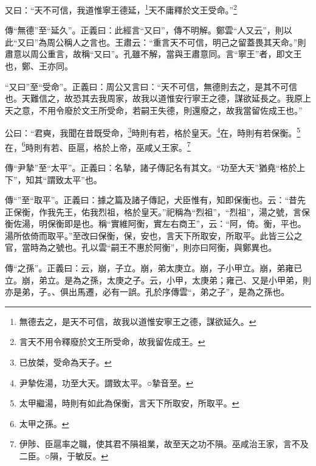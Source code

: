 又曰：“天不可信，我道惟寧王德延，\footnote{無德去之，是天不可信，故我以道惟安寧王之德，謀欲延久。}天不庸釋於文王受命。”\footnote{言天不用令釋廢於文王所受命，故我留佐成王。}


{\noindent\zhuan{}\fzbyks 傳“無德”至“延久”。正義曰：此經言“又曰”，傳不明解。鄭雲“人又云”，則以此“又曰”為周公稱人之言也。王肅云：“重言天不可信，明己之留蓋畏其天命。”則肅意以周公重言，故稱“又曰”。孔雖不解，當與王肅意同。言“寧王”者，即文王也，鄭、王亦同。 \par}

{\noindent\shu{}\fzkt “又曰”至“受命”。正義曰：周公又言曰：“天不可信，無德則去之，是其不可信也。天難信之，故恐其去我周家，故我以道惟安行寧王之德，謀欲延長之。我原上天之意，不用令廢於文王所受命，若嗣王失德，則還廢之，故我當留佐成王也。” \par}

公曰：“君奭，我聞在昔既受命，\footnote{已放桀，受命為天子。}時則有若，格於皇天。\footnote{尹摯佐湯，功至大天。謂致太平。○摯音至。}在，時則有若保衡。\footnote{太甲繼湯，時則有如此為保衡，言天下所取安，所取平。}在，\footnote{太甲之孫。}時則有若、臣扈，格於上帝，巫咸乂王家。\footnote{伊陟、臣扈率之職，使其君不隕祖業，故至天之功不隕。巫咸治王家，言不及二臣。○隕，于敏反。}


{\noindent\zhuan{}\fzbyks 傳“尹摯”至“太平”。正義曰：名摯，諸子傳記名有其文。“功至大天”猶堯“格於上下”，知其“謂致太平”也。 \par}

{\noindent\zhuan{}\fzbyks 傳“”至“取平”。正義曰：據之篇及諸子傳記，犬臣惟有，知即保衡也。云：“昔先正保衡，作我先王，佑我烈祖，格於皇天。”祀稱為“烈祖”，“烈祖”，湯之號，言保衡佐湯，明保衡即是也。稱“實維阿衡，實左右商王”，云：“阿，倚。衡，平也。湯所依倚而取平。”至改曰保衡，保，安也，言天下所取安，所取平。此皆三公之官，當時為之號也。孔以雲“嗣王不惠於阿衡”，則亦曰阿衡，與鄭異也。 \par}

{\noindent\zhuan{}\fzbyks 傳“之孫”。正義曰：云，崩，子立。崩，弟太庚立。崩，子小甲立。崩，弟雍已立。崩，弟立。是為之孫，太庚之子。云，小甲，太庚弟；雍己、又是小甲弟，則亦是弟，子。、俱出馬遷，必有一誤。孔於序傳雲“，弟之子”，是為之孫也。 \par}

